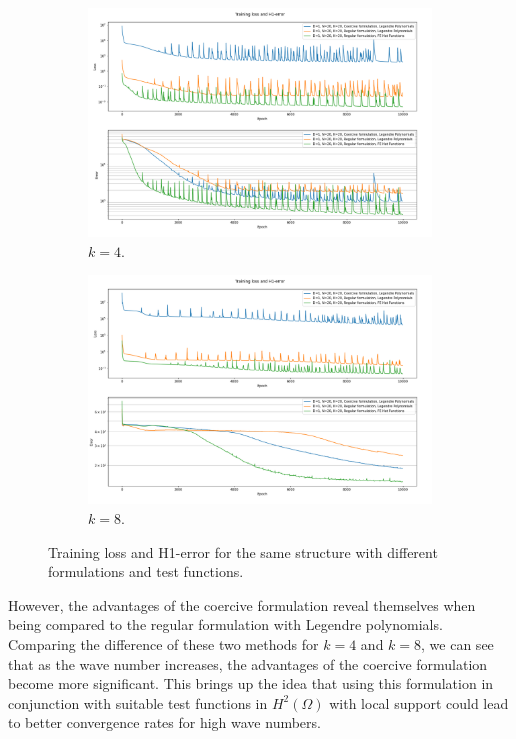 \begin{figure}[h!]
    \centering
    \begin{subfigure}[b]{0.48\textwidth}
        \includegraphics[width=\textwidth]{img/VPINN-Comparison-HFk4.png}
        \caption{$k=4$.}
        \label{fig:coercivek4}
    \end{subfigure}
    \hfill
    \begin{subfigure}[b]{0.48\textwidth}
        \includegraphics[width=\textwidth]{img/VPINN-Comparison-HFk8.png}
        \caption{$k=8$.}
        \label{fig:coercivek8}
    \end{subfigure}
    \caption{Training loss and H1-error for the same structure with different formulations and test functions.}
    \label{fig:coercive}
\end{figure}

However, the advantages of the coercive formulation reveal themselves when being compared to the regular formulation with Legendre polynomials. Comparing the difference of these two methods for $k=4$ and $k=8$, we can see that as the wave number increases, the advantages of the coercive formulation become more significant. This brings up the idea that using this formulation in conjunction with suitable test functions in $H^2(\Omega)$ with local support could lead to better convergence rates for high wave numbers.

